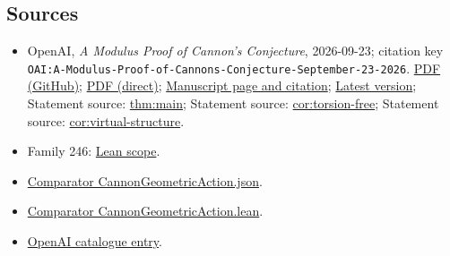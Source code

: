\documentclass[11pt]{article}
\begin{document}
\subsection{Sources}
\begin{itemize}
\item OpenAI, \emph{A Modulus Proof of Cannon's Conjecture}, 2026-09-23; citation key \texttt{OAI:A-Modulus-Proof-of-Cannons-Conjecture-September-23-2026}. \href{https://github.com/openai/math/blob/adc7f1241b42e322a6451854ab7e4b4c146bf78a/preprints/A-Modulus-Proof-of-Cannons-Conjecture-September-23-2026/paper.pdf}{PDF (GitHub)}; \href{https://github.com/openai/math/raw/adc7f1241b42e322a6451854ab7e4b4c146bf78a/preprints/A-Modulus-Proof-of-Cannons-Conjecture-September-23-2026/paper.pdf}{PDF (direct)}; \href{https://github.com/openai/math/blob/adc7f1241b42e322a6451854ab7e4b4c146bf78a/preprints/A-Modulus-Proof-of-Cannons-Conjecture-September-23-2026/README.md}{Manuscript page and citation}; \href{https://github.com/openai/math/blob/main/preprints/A-Modulus-Proof-of-Cannons-Conjecture-September-23-2026/paper.pdf}{Latest version}; Statement source: \href{https://github.com/openai/math/blob/adc7f1241b42e322a6451854ab7e4b4c146bf78a/preprints/A-Modulus-Proof-of-Cannons-Conjecture-September-23-2026/build/main.tex\#L94}{thm:main}; Statement source: \href{https://github.com/openai/math/blob/adc7f1241b42e322a6451854ab7e4b4c146bf78a/preprints/A-Modulus-Proof-of-Cannons-Conjecture-September-23-2026/build/main.tex\#L277}{cor:torsion-free}; Statement source: \href{https://github.com/openai/math/blob/adc7f1241b42e322a6451854ab7e4b4c146bf78a/preprints/A-Modulus-Proof-of-Cannons-Conjecture-September-23-2026/build/main.tex\#L289}{cor:virtual-structure}.
\item Family 246: \href{https://github.com/openai/math/blob/adc7f1241b42e322a6451854ab7e4b4c146bf78a/lean/docs/246.md}{Lean scope}.
\item \href{https://github.com/openai/math/blob/adc7f1241b42e322a6451854ab7e4b4c146bf78a/lean/ComparatorChallenges/CannonGeometricAction.json}{Comparator CannonGeometricAction.json}.
\item \href{https://github.com/openai/math/blob/adc7f1241b42e322a6451854ab7e4b4c146bf78a/lean/ComparatorChallenges/CannonGeometricAction.lean}{Comparator CannonGeometricAction.lean}.
\item \href{https://github.com/openai/math/blob/adc7f1241b42e322a6451854ab7e4b4c146bf78a/CONTENTS.md}{OpenAI catalogue entry}.
\end{itemize}
\end{document}
